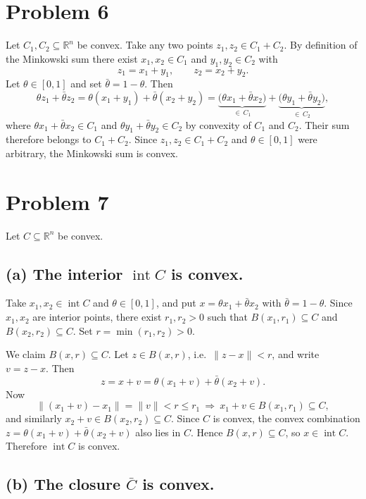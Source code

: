 \documentclass[UTF8,a4paper,12pt]{ctexart}
\newcommand{\R}{\mathbb{R}}
\newcommand{\intset}{\operatorname{int}}
\begin{document}
\section*{Problem 6}

Let $C_1,C_2\subseteq\R^n$ be convex. Take any two points
$z_1,z_2\in C_1+C_2$. By definition of the Minkowski sum there exist
$x_1,x_2\in C_1$ and $y_1,y_2\in C_2$ with
\[
z_1=x_1+y_1,\qquad z_2=x_2+y_2 .
\]
Let $\theta\in[0,1]$ and set $\bar\theta=1-\theta$. Then
\[
\theta z_1+\bar\theta z_2
=\theta(x_1+y_1)+\bar\theta(x_2+y_2)
=\underbrace{\bigl(\theta x_1+\bar\theta x_2\bigr)}_{\in\,C_1}
+\underbrace{\bigl(\theta y_1+\bar\theta y_2\bigr)}_{\in\,C_2},
\]
where $\theta x_1+\bar\theta x_2\in C_1$ and
$\theta y_1+\bar\theta y_2\in C_2$ by convexity of $C_1$ and $C_2$. Their sum
therefore belongs to $C_1+C_2$. Since $z_1,z_2\in C_1+C_2$ and
$\theta\in[0,1]$ were arbitrary, the Minkowski sum is convex.

\section*{Problem 7}

Let $C\subseteq\R^n$ be convex.

\subsection*{(a) The interior $\intset C$ is convex.}

Take $x_1,x_2\in\intset C$ and $\theta\in[0,1]$, and put
$x=\theta x_1+\bar\theta x_2$ with $\bar\theta=1-\theta$. Since $x_1,x_2$ are
interior points, there exist $r_1,r_2>0$ such that
$B(x_1,r_1)\subseteq C$ and $B(x_2,r_2)\subseteq C$. Set
$r=\min(r_1,r_2)>0$.

We claim $B(x,r)\subseteq C$. Let $z\in B(x,r)$, i.e.\ $\lVert z-x\rVert<r$, and
write $v=z-x$. Then
\[
z=x+v=\theta(x_1+v)+\bar\theta(x_2+v).
\]
Now
\[
\lVert(x_1+v)-x_1\rVert=\lVert v\rVert<r\le r_1
\ \Longrightarrow\ x_1+v\in B(x_1,r_1)\subseteq C,
\]
and similarly $x_2+v\in B(x_2,r_2)\subseteq C$. Since $C$ is convex, the convex
combination $z=\theta(x_1+v)+\bar\theta(x_2+v)$ also lies in $C$. Hence
$B(x,r)\subseteq C$, so $x\in\intset C$. Therefore $\intset C$ is convex.

\subsection*{(b) The closure $\bar C$ is convex.}
\end{document}
